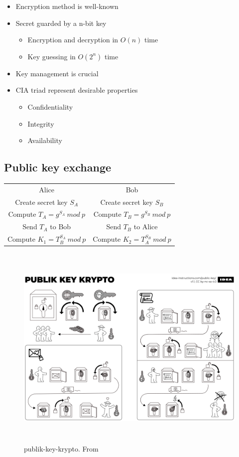 \begin{itemize}
\item Encryption method is well-known
\item Secret guarded by a n-bit key
  \begin{itemize}
    \item Encryption and decryption in $O(n)$ time
    \item Key guessing in $O(2^n)$ time
  \end{itemize}
\item Key management is crucial
\item CIA triad represent desirable properties
  \begin{itemize}
  \item Confidentiality
  \item Integrity
  \item Availability
  \end{itemize}
\end{itemize}

\subsection{Public key exchange}
\begin{center}
\begin{tabular}{ c c }
 Alice & Bob \\
 Create secret key $S_A$ & Create secret key $S_B$ \\
 Compute $T_A=g^{S_A} \: mod \: p$ & Compute $T_B=g^{S_B} \: mod \: p$ \\
 Send $T_A$ to Bob & Send $T_B$ to Alice \\
 Compute $K_1=T_B^{S_A} \: mod \: p$ & Compute $K_2=T_A^{S_B} \: mod \: p$ \\
\end{tabular}
\end{center}

\begin{figure}[h]
    \vspace{10mm}
    \centering
    \includegraphics[width=16cm, height=10cm]{image/publik-key-krypto.png}
    \caption{publik-key-krypto. From \cite{}}
\end{figure}


